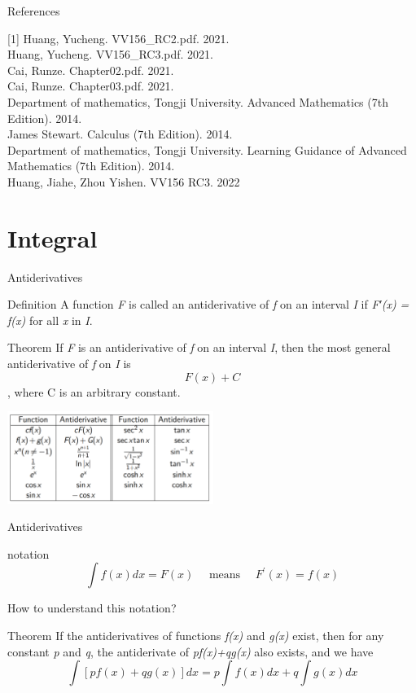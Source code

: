 \documentclass{beamer}
\begin{document}
\begin{frame}{References}
	
	[1] Huang, Yucheng. VV156\_RC2.pdf. 2021.\\
	\bigskip
	[2] Huang, Yucheng. VV156\_RC3.pdf. 2021.\\
	\bigskip
	[3] Cai, Runze. Chapter02.pdf. 2021.\\
	\bigskip
	[4] Cai, Runze. Chapter03.pdf. 2021.\\
\bigskip
	[5] Department of mathematics, Tongji University. Advanced Mathematics (7th Edition). 2014.\\
		\bigskip
		[6] James Stewart. Calculus (7th Edition). 2014.\\
		\bigskip
		[7] Department of mathematics, Tongji University. Learning Guidance of Advanced Mathematics (7th Edition). 2014.\\
		\bigskip
		[8]Huang, Jiahe, Zhou Yishen. VV156 RC3. 2022\\
\end{frame}


\section{Integral}
\begin{frame}{Antiderivatives}
\begin{block}{Definition}
    A function \textit{F} is called an antiderivative of \textit{f} on an interval \textit{I} if \textit{F′(x) = f(x)} for all \textit{x} in \textit{I}.
\end{block}
\begin{block}{Theorem}
    If \textit{F} is an antiderivative of \textit{f} on an interval \textit{I}, then the most general antiderivative of \textit{f} on \textit{I} is $$F(x)+C$$,
    where C is an arbitrary constant.
\end{block}
\begin{center}
    \includegraphics[height=3cm]{anti.png}
\end{center}

\end{frame}

\begin{frame}{Antiderivatives}
\begin{block}{notation}
    $$
\int f(x) d x=F(x) \quad \text { means } \quad F^{\prime}(x)=f(x)
$$
\end{block}
How to understand this notation?
    \begin{block}{Theorem}
        If the antiderivatives of functions \textit{f(x)} and \textit{g(x)} exist, then for any constant \textit{p} and \textit{q}, the antiderivate of \textit{pf(x)+qg(x)} also exists, and we have
        $$\int[pf(x)+qg(x)]dx=p\int f(x)dx+q\int g(x)dx$$
    \end{block}
\end{frame}
\end{document}
